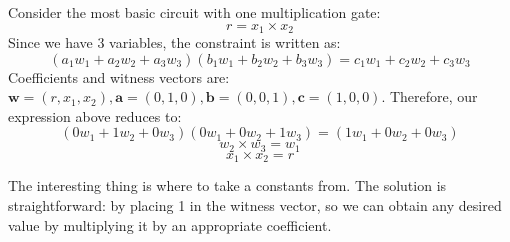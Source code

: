 \documentclass[../lecture-notes.tex]{subfiles}
\begin{document}
\begin{example}
    Consider the most basic circuit with one multiplication gate:
    \begin{equation*}
        r = x_1 \times x_2
    \end{equation*}
    Since we have $3$ variables, the constraint is written as:
    \[(a_1w_1 + a_2w_2 + a_3w_3)(b_1w_1 + b_2w_2 + b_3w_3) = c_1w_1 + c_2w_2 + c_3w_3\]
    Coefficients and witness vectors are:
    $\mathbf{w} = (r, x_1, x_2), \mathbf{a} = (0, 1, 0), \mathbf{b} = (0, 0, 1), \mathbf{c} = (1, 0, 0)$. Therefore, our expression above reduces to:
    \[ (0w_1 + 1w_2 + 0w_3)(0w_1 + 0w_2 + 1w_3) = (1w_1 + 0w_2 + 0w_3) \]
    \[ w_2 \times w_3 = w_1 \]
    \[ x_1 \times x_2 = r \]
\end{example}

The interesting thing is where to take a constants from. The solution is straightforward: by placing
1 in the witness vector, so we can obtain any desired value by multiplying it by an appropriate 
coefficient.
\end{document}
